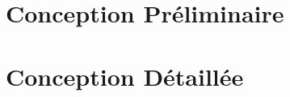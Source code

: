 \documentclass[10pt]{report}
\begin{document}
        \newpage
        \section{Conception Préliminaire}
        	
        	
        	
        	

        \newpage
        \section{Conception Détaillée}
        	
        	
        	
        	
        	
        	
        	
\end{document}
